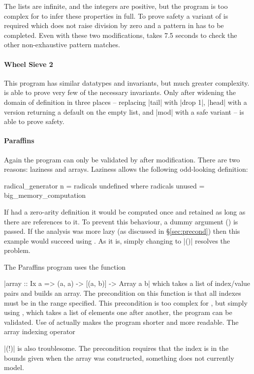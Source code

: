 The lists are infinite, and the integers are positive, but the program is too complex for \catch{} to infer these properties in full. To prove safety a variant of  is required which does not raise division by zero and a pattern in  has to be completed. Even with these two modifications, \catch{} takes 7.5 seconds to check the other non-exhaustive pattern matches.


\paragraph{Wheel Sieve 2}

This program has similar datatypes and invariants, but much greater complexity. \catch{} is able to prove very few of the necessary invariants. Only after widening the domain of definition in three places -- replacing |tail| with |drop 1|, |head| with a version returning a default on the empty list, and |mod| with a safe variant -- is \catch{} able to prove safety.


\paragraph{Paraffins}

Again the program can only be validated by \catch{} after modification. There are two reasons: laziness and arrays. Laziness allows the following odd-looking definition:

\begin{comment}
\begin{code}
big_memory_computation = undefined
\end{code}
\end{comment}

\begin{code}
radical_generator n = radicals undefined
  where radicals unused = big_memory_computation
\end{code}

If  had a zero-arity definition it would be computed once and retained as long as there are references to it. To prevent this behaviour, a dummy argument () is passed. If the analysis was more lazy (as discussed in \S\ref{sec:precond}) then this example would succeed using \catch{}. As it is, simply changing  to |()| resolves the problem.

The Paraffins program uses the function \ignore|array :: Ix a => (a, a) -> [(a, b)] -> Array a b| which takes a list of index/value pairs and builds an array. The precondition on this function is that all indexes must be in the range specified. This precondition is too complex for \catch{}, but simply using , which takes a list of elements one after another, the program can be validated. Use of  actually makes the program shorter and more readable. The array indexing operator \ignore|(!)| is also troublesome. The precondition requires that the index is in the bounds given when the array was constructed, something \catch{} does not currently model.



